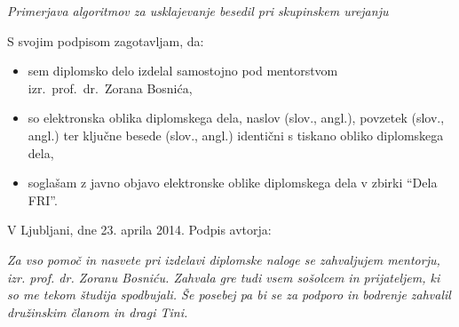 \documentclass[a4paper, 12pt, twoside]{book}
\newcommand{\clearemptydoublepage}{\newpage{\pagestyle{empty}\cleardoublepage}} %
\begin{document}
\vspace{0.5cm}
{\large \emph{Primerjava algoritmov za usklajevanje besedil pri skupinskem urejanju}}

\vspace{1.5cm}
\noindent S svojim podpisom zagotavljam, da:
\begin{itemize}
	\item sem diplomsko delo izdelal samostojno pod mentorstvom izr.\ prof.\ dr.\ Zorana Bosnića,
	\item so elektronska oblika diplomskega dela, naslov (slov., angl.), povzetek (slov., angl.) ter ključne besede (slov., angl.) identični s tiskano obliko diplomskega dela,
	\item soglašam z javno objavo elektronske oblike diplomskega dela v zbirki “Dela FRI”.
\end{itemize}

\vspace{1cm}
\noindent V Ljubljani, dne 23. aprila 2014. \hfill Podpis avtorja:

\clearemptydoublepage

\thispagestyle{empty}\mbox{}\vfill\null\it%
Za vso pomoč in nasvete pri izdelavi diplomske naloge se zahvaljujem mentorju, izr. prof. dr. Zoranu Bosniću. Zahvala gre tudi vsem sošolcem in prijateljem, ki so me tekom študija spodbujali. Še posebej pa bi se za podporo in bodrenje zahvalil družinskim članom in dragi Tini. \rm\normalfont

\clearemptydoublepage

\def\thepage{} %
\tableofcontents{}

\end{document}
